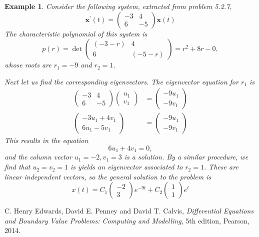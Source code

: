 \documentclass[11pt]{amsart}
\newtheorem{example}{Example}
\numberwithin{equation}{section}
\begin{document}
\begin{example}
Consider the following system, extracted from problem 5.2.7, 
\begin{equation*}
\mathbf{x}^{'}(t) = \left(
\begin{matrix}
-3 & 4 \\
6 & -5
\end{matrix}
\right) \mathbf{x}(t)
\end{equation*}
The characteristic polynomial of this system is
\begin{equation*}
p(r) = \det \left(
\begin{matrix}
(-3-r) & 4 \\
6 & (-5-r)
\end{matrix}
\right) =r^2+8r-0,
\end{equation*}
whose roots are $r_1=-9$ and $r_2=1$. 

Next let us find the corresponding eigenvectors. The eigenvector equation for $r_1$ is 
\begin{align*}
\left(
\begin{matrix}
-3 & 4 \\
6 & -5
\end{matrix}
\right) \left(
\begin{matrix}
u_1 \\
v_1
\end{matrix} 
\right) & = \left(
\begin{matrix}
-9u_1 \\
-9v_1
\end{matrix}
\right) \\
\left(
\begin{matrix}
-3u_1+4v_1 \\
6u_1 -5v_1
\end{matrix}
\right) & = \left(
\begin{matrix}
-9u_1 \\
-9v_1
\end{matrix}
\right)
\end{align*}
This results in the equation 
\begin{equation*}
6u_1+4v_1 = 0,
\end{equation*}
and the column vector $u_1=-2, v_1=3$ is a solution. By a similar procedure, we find that $u_2=v_2=1$ is yields an eigenvector associated to $r_2 =1$. These are linear independent vectors, so the general solution to the problem is 
\begin{equation*}
x(t) = C_1\left( 
\begin{matrix}
-2 \\
3
\end{matrix}
\right)e^{-9t} + C_2\left(
\begin{matrix}
1 \\
1
\end{matrix}\right)e^t
\end{equation*}
\end{example}

\begin{thebibliography}{0}

 C. Henry Edwards, David E. Penney and David T. Calvis, {\it Differential Equations and Boundary Value Problems: Computing and Modelling}, 5th edition, Pearson, 2014.

\end{thebibliography}
\end{document}
